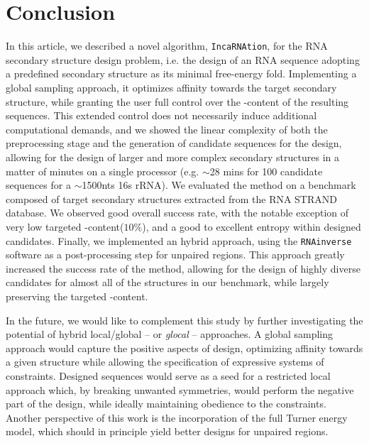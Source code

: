 \documentclass{bioinfo}
\newcommand{\RNAinverse}{\texttt{RNAinverse}\xspace}
\newcommand{\GC}{\Gb\Cb}
\newcommand{\GCContent}{\Gb\Cb-content\xspace}
\newcommand{\ourprog}{\texttt{IncaRNAtion}\xspace}
\newcommand{\RNASTRAND}{{\sf RNA STRAND}\xspace}
\newcommand{\Cb}{{\sf{C}}\xspace}
\newcommand{\Gb}{{\sf{G}}\xspace}
\begin{document}
\begin{figure*}[ht!]
  \centering
  \texttt{[image: \{Waldispuhl.337.fig.10]}.pdf}
  \caption{Sequence identity of \ourprog and \RNAinverse for $10$ and $30\%$ of \GC.}
  \label{fig:benchmark_RNASSD}
\end{figure*}





\section{Conclusion}

\label{sec:conclusion}

In this article, we described a novel algorithm, \ourprog, for the RNA secondary structure design problem, i.e. the design of an RNA sequence adopting a predefined secondary structure as its minimal free-energy fold. Implementing a global sampling approach, it optimizes affinity towards the target secondary structure, while granting the user full control over the \GCContent of the resulting sequences.
This extended control does not necessarily induce additional computational demands, and we showed the linear complexity of both the preprocessing stage and the generation of candidate sequences for the design, allowing for the design of larger and more complex secondary structures in a matter of minutes on a single processor (e.g. $\sim$28 mins for 100 candidate sequences for a $\sim$1500nts 16s rRNA). We evaluated the method on a benchmark composed of target secondary structures extracted from the \RNASTRAND database. We observed good overall success rate, with the notable exception of very low targeted \GCContent ($10\%$), and a good to excellent entropy within designed candidates.
Finally, we implemented an hybrid approach, using the \RNAinverse software as a post-processing step for unpaired regions. This approach greatly increased the success rate of the method, allowing for the design of highly diverse candidates for almost all of the structures in our benchmark, while largely preserving the targeted \GCContent.

In the future, we would like to complement this study by further investigating the potential of hybrid local/global -- or {\em glocal} -- approaches. A global sampling approach would capture the positive aspects of design, optimizing affinity towards a given structure while allowing the specification of expressive systems of constraints. Designed sequences would serve as a seed for a restricted local approach which, by breaking unwanted symmetries, would perform the negative part of the design, while ideally maintaining obedience to the constraints. Another perspective of this work is the incorporation of the full Turner energy model, which should in principle yield better designs for unpaired regions.
\end{document}
